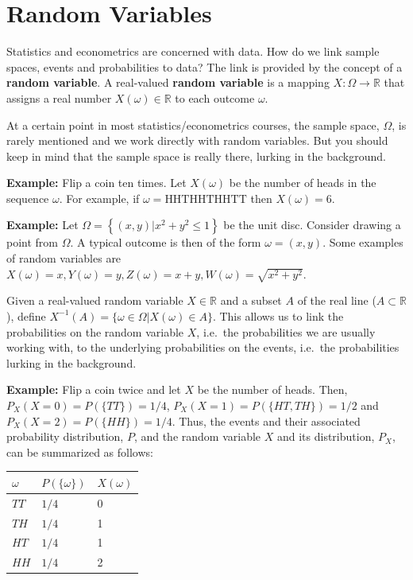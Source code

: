 \documentclass[
  letterpaper,
  DIV=11,
  numbers=noendperiod]{scrreprt}
\theoremstyle{definition}
\theoremstyle{plain}
\theoremstyle{plain}
\theoremstyle{remark}
\begin{document}
\hypertarget{random-variables}{%
\section{Random Variables}\label{random-variables}}

Statistics and econometrics are concerned with data. How do we link
sample spaces, events and probabilities to data? The link is provided by
the concept of a \textbf{random variable}. A real-valued \textbf{random
variable} is a mapping \(X: \Omega \rightarrow \mathbb{R}\) that assigns
a real number \(X(\omega)\in\mathbb{R}\) to each outcome \(\omega\).

At a certain point in most statistics/econometrics courses, the sample
space, \(\Omega\), is rarely mentioned and we work directly with random
variables. But you should keep in mind that the sample space is really
there, lurking in the background.

\textbf{Example:} Flip a coin ten times. Let \(X(\omega)\) be the number
of heads in the sequence \(\omega.\) For example, if
\(\omega=\text{HHTHHTHHTT}\) then \(X(\omega)=6\).

\textbf{Example:} Let
\(\Omega=\left\{(x, y)|x^{2}+y^{2} \leq 1\right\}\) be the unit disc.
Consider drawing a point  from \(\Omega\). A typical
outcome is then of the form \(\omega=(x, y) .\) Some examples of random
variables are
\(X(\omega)=x, Y(\omega)=y, Z(\omega)=x+y, W(\omega)=\sqrt{x^{2}+y^{2}}\).

Given a real-valued random variable \(X\in\mathbb{R}\) and a subset
\(A\) of the real line (\(A\subset\mathbb{R}\)), define
\(X^{-1}(A)=\{\omega \in \Omega|X(\omega) \in A\}\). This allows us to
link the probabilities on the random variable \(X\), i.e.~the
probabilities we are usually working with, to the underlying
probabilities on the events, i.e.~the probabilities lurking in the
background.

\textbf{Example:} Flip a coin twice and let \(X\) be the number of
heads. Then, \(P_X(X=0)=P(\{T T\})=1 / 4\),
\(P_X(X=1)=P(\{H T, T H\})=1 / 2\) and \(P_X(X=2)=P(\{H H\})=1 / 4\).
Thus, the events and their associated probability distribution, \(P\),
and the random variable \(X\) and its distribution, \(P_X\), can be
summarized as follows:

\begin{longtable}[]{@{}lll@{}}
\toprule()
\(\omega\) & \(P(\{\omega\})\) & \(X(\omega)\) \\
\midrule()
\endhead
\(T T\) & \(1 / 4\) & 0 \\
\(T H\) & \(1 / 4\) & 1 \\
\(H T\) & \(1 / 4\) & 1 \\
\(H H\) & \(1 / 4\) & 2 \\
\bottomrule()
\end{longtable}
\end{document}
